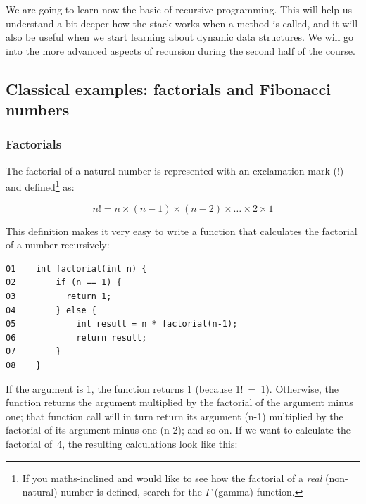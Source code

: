 We are going to learn now the basic of recursive programming. This
will help us understand a bit deeper how the stack works when a method
is called, and it will also be useful when we start learning about
dynamic data structures. We will go into the more advanced aspects of
recursion during the second half of the course. 

\subsection{Classical examples: factorials and Fibonacci numbers}
\label{sec:class-exampl-fact}

\subsubsection{Factorials}

The factorial of a natural number is represented with an exclamation
mark (!) and defined\footnote{If you maths-inclined and would like to see
  how the factorial of a \emph{real} (non-natural) number is defined, search for the
  $\Gamma$ (gamma) function.} as:  

$$ n! = n \times (n - 1) \times (n - 2) \times \ldots \times 2 \times 1 $$

This definition makes it very easy to write a function that calculates
the factorial of a number recursively: 

\begin{verbatim}
01    int factorial(int n) {
02        if (n == 1) {
03          return 1; 
04        } else {
05            int result = n * factorial(n-1);
06            return result;
07        }
08    }
\end{verbatim}

If the argument is 1, the function returns 1 (because 
\mbox{1! = 1).} 
Otherwise, the function returns the argument multiplied by the
factorial of the argument minus one; that function call will in turn
return its argument (n-1) multiplied by the factorial of its argument
minus one (n-2); and so on. If we want to calculate the factorial
of~4, the resulting calculations look like this: 

